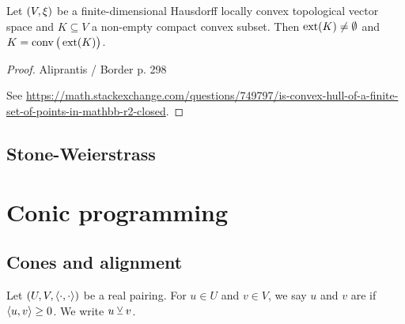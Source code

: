 \begin{proposition}
Let $\sSet{V,\xi}$ be a finite-dimensional Hausdorff locally convex topological vector space and $K\subseteq V$ a non-empty compact convex subset. Then $\operatorname{ext}(K)\neq \emptyset$ and $K = \operatorname{conv}\big(\operatorname{ext}(K)\big)$.
\end{proposition}
\begin{proof}
Aliprantis / Border p. 298

See \url{https://math.stackexchange.com/questions/749797/is-convex-hull-of-a-finite-set-of-points-in-mathbb-r2-closed}.
\end{proof}


\subsection{Stone-Weierstrass}

\begin{proposition}

\end{proposition}

\section{Conic programming}
\subsection{Cones and alignment}
\begin{definition}
Let $\sSet{U,V,\pair{\cdot,\cdot}}$ be a real pairing. For $u\in U$ and $v\in V$, we say $u$ and $v$ are  if $\left\langle u,v \right\rangle\geq 0$. We write $u \veebar v$.
\end{definition}


